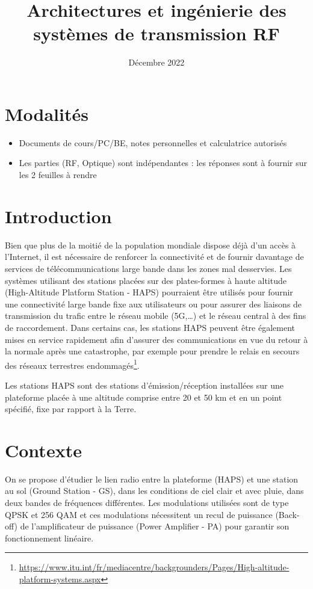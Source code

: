 \documentclass[a4paper,11pt]{article}
\title{\textbf{Architectures et ingénierie des systèmes de transmission RF}}
\author{Décembre 2022}
\date{}
\begin{document}
\maketitle

\section*{Modalités}

\begin{itemize}
    \item Documents de cours/PC/BE, notes personnelles et calculatrice autorisés
    \item Les parties (RF, Optique) sont indépendantes : les réponses sont à fournir sur les 2 feuilles à rendre
\end{itemize}

\section*{Introduction}

Bien que plus de la moitié de la population mondiale dispose déjà d'un accès à l'Internet, il est nécessaire de renforcer la connectivité et de fournir davantage de services de télécommunications large bande dans les zones mal desservies. Les systèmes utilisant des stations placées sur des plates-formes à haute altitude (High-Altitude Platform Station - HAPS) pourraient être utilisés pour fournir une connectivité large bande fixe aux utilisateurs ou pour assurer des liaisons de transmission du trafic entre le réseau mobile (5G,\ldots) et le réseau central à des fins de raccordement. Dans certains cas, les stations HAPS peuvent être également mises en service rapidement afin d'assurer des communications en vue du retour à la normale après une catastrophe, par exemple pour prendre le relais en secours des réseaux terrestres endommagés\footnote{\url{https://www.itu.int/fr/mediacentre/backgrounders/Pages/High-altitude-platform-systems.aspx}}.

Les stations HAPS sont des stations d'émission/réception installées sur une plateforme placée à une altitude comprise entre 20 et 50 km et en un point spécifié, fixe par rapport à la Terre.

\section*{Contexte}

On se propose d'étudier le lien radio entre la plateforme (HAPS) et une station au sol (Ground Station - GS), dans les conditions de ciel clair et avec pluie, dans deux bandes de fréquences différentes. Les modulations utilisées sont de type QPSK et 256 QAM et ces modulations nécessitent un recul de puissance (Back-off) de l'amplificateur de puissance (Power Amplifier - PA) pour garantir son fonctionnement linéaire.
\end{document}
